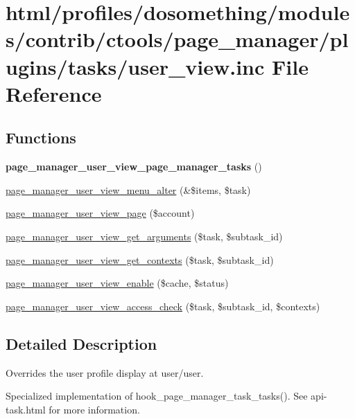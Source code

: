 \hypertarget{user__view_8inc}{
\section{html/profiles/dosomething/modules/contrib/ctools/page\_\-manager/plugins/tasks/user\_\-view.inc File Reference}
\label{user__view_8inc}
}
\subsection*{Functions}
\begin{DoxyCompactItemize}
\item 
\hypertarget{user__view_8inc_adb383aac6b6191e70de92444bd61e106}{
{\bfseries page\_\-manager\_\-user\_\-view\_\-page\_\-manager\_\-tasks} ()}
\label{user__view_8inc_adb383aac6b6191e70de92444bd61e106}

\item 
\hyperlink{user__view_8inc_aea07e4948f35a4526683a303d3d86fe8}{page\_\-manager\_\-user\_\-view\_\-menu\_\-alter} (\&\$items, \$task)
\item 
\hyperlink{user__view_8inc_a5f43335f12371da4076984ce321f749d}{page\_\-manager\_\-user\_\-view\_\-page} (\$account)
\item 
\hyperlink{user__view_8inc_a9ef4fdfd423bb6f2703b453992bb0ccc}{page\_\-manager\_\-user\_\-view\_\-get\_\-arguments} (\$task, \$subtask\_\-id)
\item 
\hyperlink{user__view_8inc_a89888e8d3a6902a2140f9b8f1f7ba63d}{page\_\-manager\_\-user\_\-view\_\-get\_\-contexts} (\$task, \$subtask\_\-id)
\item 
\hyperlink{user__view_8inc_a1dcdbc73cf9657503d8128cc9386a038}{page\_\-manager\_\-user\_\-view\_\-enable} (\$cache, \$status)
\item 
\hyperlink{user__view_8inc_ad31baaaec704d63b5a50df5b502b9d52}{page\_\-manager\_\-user\_\-view\_\-access\_\-check} (\$task, \$subtask\_\-id, \$contexts)
\end{DoxyCompactItemize}


\subsection{Detailed Description}
Overrides the user profile display at user/user.

Specialized implementation of hook\_\-page\_\-manager\_\-task\_\-tasks(). See api-\/task.html for more information. 

